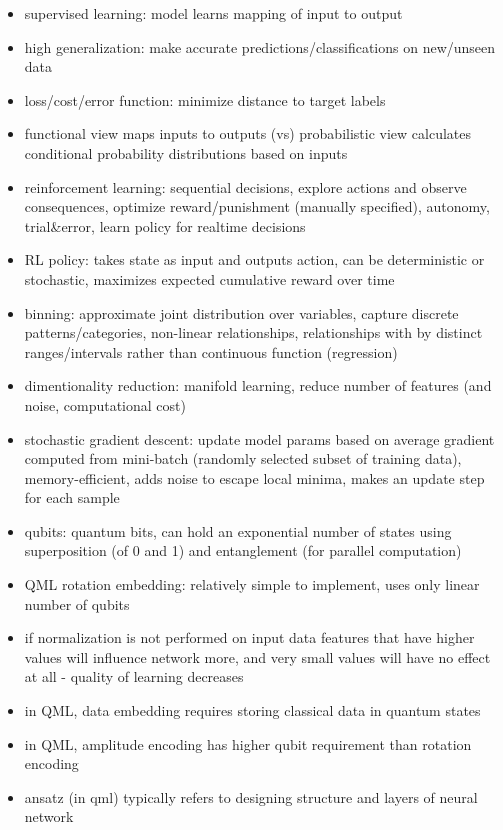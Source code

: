 \documentclass[10pt]{article}
\begin{document}
\begin{itemize}[label=\(\star\), leftmargin=1em, itemsep=-0.3em]
    \item supervised learning: model learns mapping of input to output
    \item high generalization: make accurate predictions/classifications on new/unseen data
    \item loss/cost/error function: minimize distance to target labels
    \item functional view maps inputs to outputs (vs) probabilistic view calculates conditional probability distributions based on inputs
    \item reinforcement learning: sequential decisions, explore actions and observe consequences, optimize reward/punishment (manually specified), autonomy, trial\&error, learn policy for realtime decisions
    \item RL policy: takes state as input and outputs action, can be deterministic or stochastic, maximizes expected cumulative reward over time
    \item binning: approximate joint distribution over variables, capture discrete patterns/categories, non-linear relationships, relationships with by distinct ranges/intervals rather than continuous function (regression)
    \item dimentionality reduction: manifold learning, reduce number of features (and noise, computational cost)
    \item stochastic gradient descent: update model params based on average gradient computed from mini-batch (randomly selected subset of training data), memory-efficient, adds noise to escape local minima, makes an update step for each sample
    \item qubits: quantum bits, can hold an exponential number of states using superposition (of 0 and 1) and entanglement (for parallel computation)
    \item QML rotation embedding: relatively simple to implement, uses only linear number of qubits
    \item if normalization is not performed on input data features that have higher values will influence network more, and very small values will have no effect at all - quality of learning decreases
    \item in QML, data embedding requires storing classical data in quantum states
    \item in QML, amplitude encoding  has higher qubit requirement than rotation encoding
    \item ansatz (in qml) typically refers to designing structure and layers of neural network
\end{itemize}
\end{document}
